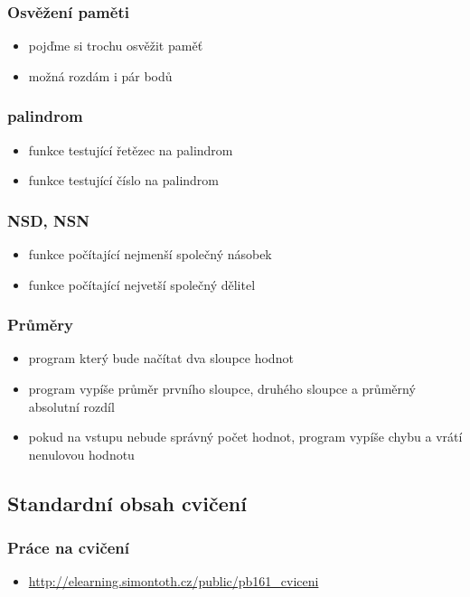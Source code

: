 \begin{frame}
	\frametitle{Osvěžení paměti}
	\begin{itemize}
		\item{pojďme si trochu osvěžit paměť}
			\item{možná rozdám i pár bodů}
	\end{itemize}
\end{frame}

\begin{frame}
	\frametitle{palindrom}
	\begin{itemize}
		\item{funkce testující řetězec na palindrom}\pause
		\item{funkce testující číslo na palindrom}
	\end{itemize}
\end{frame}

\begin{frame}
	\frametitle{NSD, NSN}
	\begin{itemize}
		\item{funkce počítající nejmenší společný násobek}
		\item{funkce počítající nejvetší společný dělitel}
	\end{itemize}
\end{frame}

\begin{frame}
	\frametitle{Průměry}
	\begin{itemize}
		\item{program který bude načítat dva sloupce hodnot}
		\item{program vypíše průměr prvního sloupce, druhého sloupce a průměrný absolutní rozdíl}
		\item{pokud na vstupu nebude správný počet hodnot, program vypíše chybu a vrátí nenulovou hodnotu}
	\end{itemize}
\end{frame}

\subsection{Standardní obsah cvičení}

\begin{frame}
	\frametitle{Práce na cvičení}
	\begin{itemize}
		\item{\href{http://elearning.simontoth.cz/public/pb161\_cviceni}{http://elearning.simontoth.cz/public/pb161\_cviceni}}
	\end{itemize}
\end{frame}






